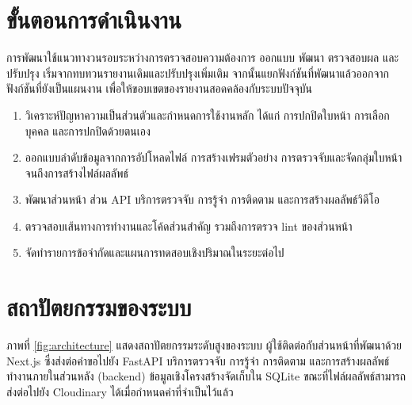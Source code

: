 \begingroup
\setlength{\intextsep}{0.5\baselineskip}

\section{ขั้นตอนการดำเนินงาน}

การพัฒนาใช้แนวทางวนรอบระหว่างการตรวจสอบความต้องการ ออกแบบ พัฒนา ตรวจสอบผล และปรับปรุง เริ่มจากทบทวนรายงานเดิมและปรับปรุงเพิ่มเติม จากนั้นแยกฟังก์ชันที่พัฒนาแล้วออกจากฟังก์ชันที่ยังเป็นแผนงาน เพื่อให้ขอบเขตของรายงานสอดคล้องกับระบบปัจจุบัน

\begin{enumerate}
    \item วิเคราะห์ปัญหาความเป็นส่วนตัวและกำหนดการใช้งานหลัก ได้แก่ การปกปิดใบหน้า การเลือกบุคคล และการปกปิดด้วยตนเอง
    \item ออกแบบลำดับข้อมูลจากการอัปโหลดไฟล์ การสร้างเฟรมตัวอย่าง การตรวจจับและจัดกลุ่มใบหน้า จนถึงการสร้างไฟล์ผลลัพธ์
    \item พัฒนาส่วนหน้า ส่วน API บริการตรวจจับ การรู้จำ การติดตาม และการสร้างผลลัพธ์วิดีโอ
    \item ตรวจสอบเส้นทางการทำงานและโค้ดส่วนสำคัญ รวมถึงการตรวจ lint ของส่วนหน้า
    \item จัดทำรายการข้อจำกัดและแผนการทดสอบเชิงปริมาณในระยะต่อไป
\end{enumerate}

\section{สถาปัตยกรรมของระบบ}

ภาพที่ \ref{fig:architecture} แสดงสถาปัตยกรรมระดับสูงของระบบ ผู้ใช้ติดต่อกับส่วนหน้าที่พัฒนาด้วย Next.js ซึ่งส่งต่อคำขอไปยัง FastAPI บริการตรวจจับ การรู้จำ การติดตาม และการสร้างผลลัพธ์ทำงานภายในส่วนหลัง (backend) ข้อมูลเชิงโครงสร้างจัดเก็บใน SQLite ขณะที่ไฟล์ผลลัพธ์สามารถส่งต่อไปยัง Cloudinary ได้เมื่อกำหนดค่าที่จำเป็นไว้แล้ว

